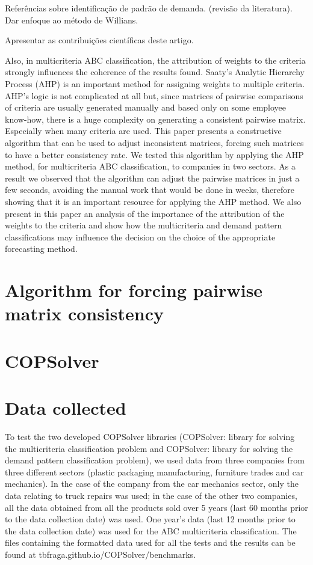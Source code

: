 \documentclass[authoryear,manuscript,12pt]{elsarticle}
\begin{document}
Referências sobre identificação de padrão de demanda. (revisão da literatura). Dar enfoque ao método de Willians.

Apresentar as contribuições científicas deste artigo.

Also, in multicriteria ABC classification, the attribution of weights to the criteria strongly influences the coherence of the results found. Saaty's Analytic Hierarchy Process (AHP) is an important method for assigning weights to multiple criteria.  AHP's logic is not complicated at all but, since matrices of pairwise comparisons of criteria  are usually generated manually and based only on some employee know-how, there is a huge complexity on generating a consistent pairwise matrix. Especially when many criteria are used. This paper presents a constructive algorithm that can be used to adjust inconsistent matrices, forcing such matrices to have a better consistency rate. We tested this algorithm by applying the AHP method, for multicriteria ABC classification, to companies in two sectors. As a result we observed that the algorithm can adjust the pairwise matrices in just a few seconds, avoiding the manual work that would be done in weeks, therefore showing that it is an important resource for applying the AHP method. We also present in this paper an analysis of the importance of the attribution of the weights to the criteria and show how the multicriteria and demand pattern classifications may influence the decision on the choice of the appropriate forecasting method.



\section{Algorithm for forcing pairwise matrix consistency}

\section{COPSolver}

\section{Data collected}
\label{sec:data}

To test the two developed COPSolver libraries (COPSolver: library for solving the multicriteria classification problem and COPSolver: library for solving the demand pattern classification problem), we used data from three companies from three different sectors (plastic packaging manufacturing, furniture trades and car mechanics). In the case of the company from the car mechanics sector, only the data relating to truck repairs was used; in the case of the other two companies, all the data obtained from all the products sold over 5 years (last 60 months prior to the data collection date) was used. One year's data (last 12 months prior to the data collection date) was used for the ABC multicriteria classification. The files containing the formatted data used for all the tests and the results can be found at tbfraga.github.io/COPSolver/benchmarks. 
\end{document}
